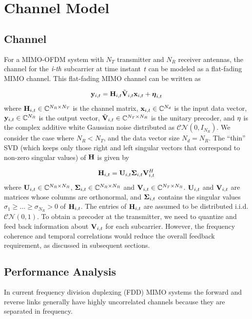 \documentclass[11pt,a4paper]{report}
\def\bx{{\bf x}}
\def\by{{\bf y}}
\def\bSigma{{\bf \Sigma}}
\def\bH{{\bf H}}
\def\bU{{\bf U}}
\def\bV{{\bf V}}
\begin{document}
\chapter{Channel Model}
\label{chap:chanMod}

\section{Channel}
For a MIMO-OFDM system with $N_T$ transmitter and $N_R$
receiver antennas, the channel for the $\emph{i-th}$ subcarrier at time
instant $\emph{t}$ can be modeled as a flat-fading MIMO channel. This
flat-fading MIMO channel can be written as

\begin{equation}
\by_{i,t} = \bH_{i,t}\tilde{\bV}_{i,t} \bx_{i,t}+ {\boldsymbol{\eta}}_{i,t}
\end{equation}
where $\bH_{i,t} \in {\mathbb{C}}^{N_R \times N_T}$ is the channel
matrix, $\bx_{i,t} \in {\mathbb{C}}^{N_d}$ is the input data vector,
$\by_{i,t} \in {\mathbb{C}}^{N_R}$ is the output vector,
$\tilde{\bV}_{i,t} \in {\mathbb{C}}^{N_T \times N_R}$ is the unitary
precoder, and $\bf{\eta}$ is the complex additive white Gaussian noise
distributed as ${\mathcal{CN}}(0,I_{N_R})$. We consider the case where
$N_R < N_T$, and the data vector size $N_d = N_R$.  The ``thin'' SVD
(which keeps only those right and left singular vectors that correspond
to non-zero singular values) of $\bH$ is given by

\begin{equation}
\bH_{i,t} = \bU_{i,t} \bSigma_{i,t} \bV_{i,t}^{H}
\end{equation}
where $\bU_{i,t} \in \mathbb{C}^{N_R \times N_R}$,
$\bSigma_{i,t} \in \mathbb{C}^{N_R \times N_R}$ and
$\bV_{i,t} \in \mathbb{C}^{N_T \times N_R}$. $\bU_{i,t}$ and
$\bV_{i,t}$ are matrices whose columns are orthonormal, and
$\bSigma_{i,t}$ contains the singular values
$\sigma_1 \geq \ldots \geq \sigma_{N_R} > 0$ of $\bH_{i,t}$. The
entries of $\bH_{i,t}$ are assumed to be distributed
i.i.d. $\mathcal{CN}(0,1)$. To obtain a precoder at the
transmitter, we need to quantize and feed back information about
$\bV_{i,t}$ for each subcarrier. However, the frequency coherence and
temporal correlations would reduce the overall feedback requirement,
as discussed in subsequent sections.

\section{Performance Analysis}
\label{sec:cap}
In current frequency division duplexing (FDD) MIMO systems the forward
and reverse links generally have highly uncorrelated channels because
they are separated in frequency.
\end{document}
